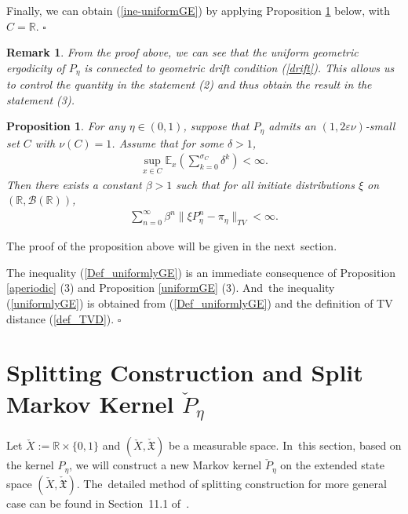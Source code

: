 \documentclass[11pt]{elsarticle}
\newtheorem{proposition}{Proposition}[section]
\newtheorem{remark}{Remark}[section]
\def\E{\mathbb{E}}
\def\R{\mathbb{R}}
\begin{document}
\begin{pf}
	Finally, we can obtain (\ref{ine-uniformGE}) by applying Proposition \ref{prop-yinna1} below, with~$C=\R$. \hfill$\square$
\end{pf}

\begin{remark}
	From the proof above, we can see that the uniform geometric ergodicity of $P_\eta$ is connected to geometric drift condition (\ref{drift}). This allows us to control the quantity in the statement (2) and thus obtain the result in the statement (3). 
\end{remark}
\begin{proposition}\label{prop-yinna1}
	For any $\eta\in(0,1)$, suppose that $P_\eta$ admits an $(1,2\varepsilon\nu)$-small set $C$ with $\nu(C)=1$.  Assume that for some $\delta>1$,
	\begin{align}\label{ine15.1.0}
		\sup_{x\in C}\E_x\left(\sum_{k=0}^{\sigma_C}\delta^k\right)<\infty.
	\end{align} 
	Then there exists a constant $\beta>1$ such that for all initiate distributions $\xi$ on $(\R,\mathcal{B}(\R))$,
	\begin{align}\label{ine4}
		\sum_{n=0}^{\infty}\beta^n\|\xi P_\eta^n-\pi_\eta\|_{TV}<\infty.
	\end{align}
\end{proposition}

The proof of the proposition above will be given in the next~section.

\begin{pot2}
	The inequality (\ref{Def_uniformlyGE}) is an immediate consequence of Proposition \ref{aperiodic} (3) and Proposition \ref{uniformGE} (3). And~the inequality (\ref{uniformlyGE}) is obtained from (\ref{Def_uniformlyGE}) and the definition of TV distance (\ref{def_TVD}). \hfill$\square$
\end{pot2}
\section{Splitting Construction and Split Markov Kernel $ \check{P} _ \eta$}\label{sec4}
Let $\check{X}:=\R\times\{0,1\}$ and $(\check{X},\check{\mathfrak{X}})$ be a measurable space. In~this section, based on the kernel $P_\eta$, we  will construct a new Markov kernel $\check{P}_\eta$ on the extended state space $(\check{X},\check{\mathfrak{X}})$. The~detailed method of splitting construction for more general case can be found in {Section~11.1} of~\cite{DMPS18}.
\end{document}
